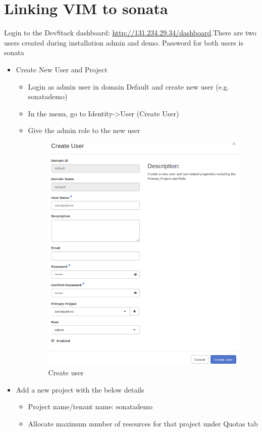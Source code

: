 	\section{Linking VIM to sonata}
	\label{sec:Linking VIM to sonata}
	Login to the DevStack dashboard: \hyperlink{name}{http://131.234.29.34/dashboard}.There are two users created during installation admin and demo. Password for both users is sonata
	\begin{itemize}
		\item Create New User and Project
		\begin{itemize}
			\item Login as admin user in domain Default and create new user (e.g. sonatademo)
			\item In the menu, go to Identity->User (Create User)
			\item Give the admin role to the new user
			\begin{figure}[h]
				\centering
				\includegraphics[width=0.7\linewidth]{figures/CreatingUser}
				\caption{Create user}
				\label{fig:creatinguser}
			\end{figure}
			\newpage
		\end{itemize}
		\item Add a new project with the below details
		\begin{itemize}
			\item Project name/tenant name: sonatademo
			\item Allocate maximum number of resources for that project under Quotas tab
			\begin{figure} [h]

\end{figure}
\end{itemize}
\end{itemize}
